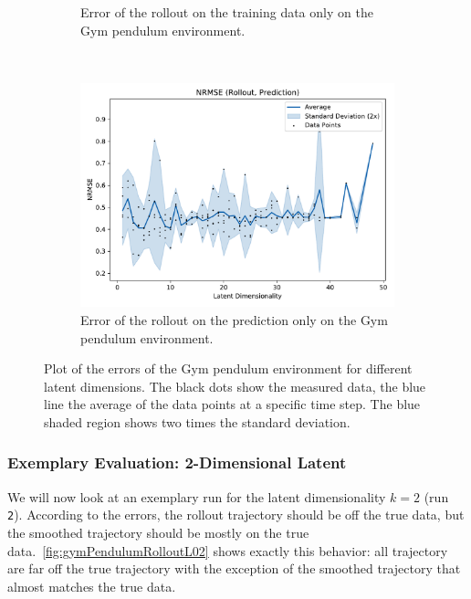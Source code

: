 \begin{figure}
\begin{subfigure}{0.5\linewidth}
					\caption[Error of the training rollout on the Gym pendulum environment]{Error of the rollout on the training data only on the Gym pendulum environment.}
					\label{fig:gymPendulumRmseTrain}
				\end{subfigure}%
				~
				\begin{subfigure}{0.5\linewidth}
					\centering
					\includegraphics[width=\linewidth]{figures/results/pendulum-gym/latent-dim/comparison-rmse-rollout-prediction-normalized-mean-vs-latent-dim.pdf}
					\caption[Error of the prediction rollout on the Gym pendulum environment]{Error of the rollout on the prediction only on the Gym pendulum environment.}
					\label{fig:gymPendulumRmsePred}
				\end{subfigure}
				\caption[Errors on the Gym pendulum environment for different latent dimensions]{Plot of the errors of the Gym pendulum environment for different latent dimensions. The black dots show the measured data, the blue line the average of the data points at a specific time step. The blue shaded region shows two times the standard deviation.}
				\label{fig:gymPendulumRmse}
			\end{figure}

		\subsubsection{Exemplary Evaluation: 2-Dimensional Latent}
			We will now look at an exemplary run for the latent dimensionality \( k = 2 \) (run \texttt{2}). According to the errors, the rollout trajectory should be off the true data, but the smoothed trajectory should be mostly on the true data.~\autoref{fig:gymPendulumRolloutL02} shows exactly this behavior: all trajectory are far off the true trajectory with the exception of the smoothed trajectory that almost matches the true data.

